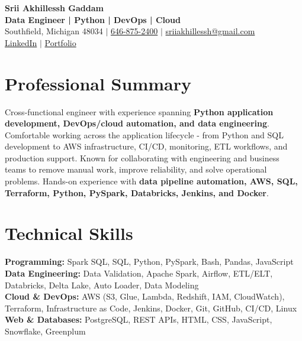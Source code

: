 \documentclass[letterpaper,10pt]{article}
\begin{document}
\fontsize{9.35pt}{10.45pt}\selectfont

\begin{center}
    {\LARGE \textbf{Srii Akhillessh Gaddam}} \\[-1pt]
    \textbf{Data Engineer | Python | DevOps | Cloud} \\[2pt]
    Southfield, Michigan 48034 $|$
    \href{tel:6468752400}{646-875-2400} $|$
    \href{mailto:sriiakhillessh@gmail.com}{sriiakhillessh@gmail.com} \\[1pt]
    \href{https://www.linkedin.com/in/srii-akhiilessh-gaddam-b48668191/}{LinkedIn} $|$
    \href{https://sriiakhillesshg.github.io/portfolio/}{Portfolio}
\end{center}
\vspace{-8pt}

\section{Professional Summary}
\small{Cross-functional engineer with experience spanning \textbf{Python application development, DevOps/cloud automation, and data engineering}. Comfortable working across the application lifecycle - from Python and SQL development to AWS infrastructure, CI/CD, monitoring, ETL workflows, and production support. Known for collaborating with engineering and business teams to remove manual work, improve reliability, and solve operational problems. Hands-on experience with \textbf{data pipeline automation, AWS, SQL, Terraform, Python, PySpark, Databricks, Jenkins, and Docker}.}

\section{Technical Skills}
\small{
\textbf{Programming:} Spark SQL, SQL, Python, PySpark, Bash, Pandas, JavaScript \\
\textbf{Data Engineering:} Data Validation, Apache Spark, Airflow, ETL/ELT, Databricks, Delta Lake, Auto Loader, Data Modeling \\
\textbf{Cloud \& DevOps:} AWS (S3, Glue, Lambda, Redshift, IAM, CloudWatch), Terraform, Infrastructure as Code, Jenkins, Docker, Git, GitHub, CI/CD, Linux \\
\textbf{Web \& Databases:} PostgreSQL, REST APIs, HTML, CSS, JavaScript, Snowflake, Greenplum
}
\end{document}

